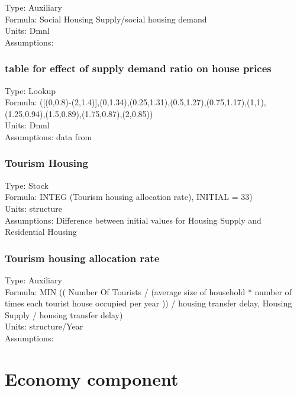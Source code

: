\documentclass[
  11pt,
]{book}
\begin{document}
Type: Auxiliary\\
Formula: Social Housing Supply/social housing demand\\
Units: Dmnl\\
Assumptions:

\hypertarget{table-for-effect-of-supply-demand-ratio-on-house-prices}{%
\subsection{table for effect of supply demand ratio on house prices}\label{table-for-effect-of-supply-demand-ratio-on-house-prices}}

Type: Lookup\\
Formula: ({[}(0,0.8)-(2,1.4){]},(0,1.34),(0.25,1.31),(0.5,1.27),(0.75,1.17),(1,1),(1.25,0.94),(1.5,0.89),(1.75,0.87),(2,0.85))\\
Units: Dmnl\\
Assumptions: data from \citet{ozbas_modeling_2014}

\hypertarget{tourism-housing}{%
\subsection{Tourism Housing}\label{tourism-housing}}

Type: Stock\\
Formula: INTEG (Tourism housing allocation rate), INITIAL = 33)\\
Units: structure\\
Assumptions: Difference between initial values for Housing Supply and Residential Housing

\hypertarget{tourism-housing-allocation-rate}{%
\subsection{Tourism housing allocation rate}\label{tourism-housing-allocation-rate}}

Type: Auxiliary\\
Formula: MIN (( Number Of Tourists / (average size of household * number of times each tourist house occupied per year )) / housing transfer delay, Housing Supply / housing transfer delay)\\
Units: structure/Year\\
Assumptions:

\hypertarget{economy-component}{%
\chapter{Economy component}\label{economy-component}}
\end{document}
